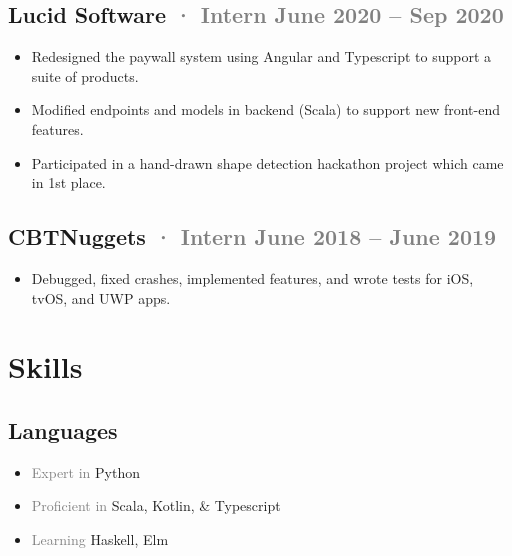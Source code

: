 \documentclass[12pt]{article} %
\providecommand{\tightlist}{%
  \setlength{\itemsep}{0pt}\setlength{\parskip}{0pt}}
\renewcommand{\emph}[1]{%
  \textcolor{gray}{#1}%
}
\begin{document}
\begin{paracol}{2}
\begin{raggedright}
\hypertarget{lucid-software-intern-june-2020-sep-2020}{%
\subsection{\texorpdfstring{Lucid Software \emph{· Intern \hfill June
2020 -- Sep
2020}}{Lucid Software · Intern June 2020 -- Sep 2020}}\label{lucid-software-intern-june-2020-sep-2020}}

\begin{itemize}
\tightlist
\item
  Redesigned the paywall system using Angular and Typescript to support
  a suite of products.
\item
  Modified endpoints and models in backend (Scala) to support new
  front-end features.
\item
  Participated in a hand-drawn shape detection hackathon project which
  came in 1st place.
\end{itemize}

\hypertarget{cbtnuggets-intern-june-2018-june-2019}{%
\subsection{\texorpdfstring{CBTNuggets \emph{· Intern \hfill June 2018
-- June
2019}}{CBTNuggets · Intern June 2018 -- June 2019}}\label{cbtnuggets-intern-june-2018-june-2019}}

\begin{itemize}
\tightlist
\item
  Debugged, fixed crashes, implemented features, and wrote tests for
  iOS, tvOS, and UWP apps.
\end{itemize}

\switchcolumn 

\hypertarget{skills}{%
\section{Skills}\label{skills}}

\hypertarget{languages}{%
\subsection{Languages}\label{languages}}

\begin{itemize}
\tightlist
\item
  \emph{Expert in} Python
\item
  \emph{Proficient in} Scala, Kotlin, \& Typescript
\item
  \emph{Learning} Haskell, Elm
\end{itemize}


\end{raggedright}
\end{paracol}
\end{document}
